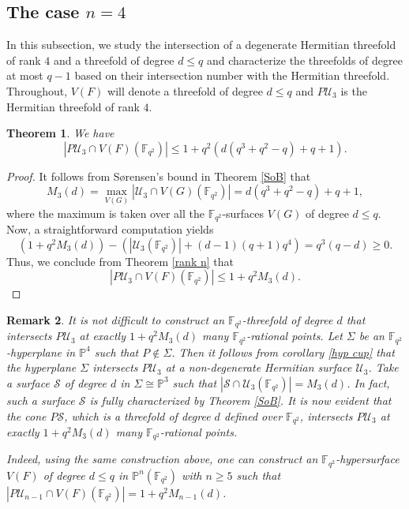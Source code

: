 \documentclass[10pt,a4paper,oneside]{amsproc}
\newtheorem{theorem}{Theorem}[section]
\newtheorem{remark}[theorem]{Remark}
\newcommand{\s}{\mathcal{S}}
\newcommand{\Fqt}{\mathbb{F}_{q^2}}
\newcommand{\U}{\mathcal{U}}
\def\PP{{\mathbb P}}
\begin{document}


\subsection{The case $n=4$}\label{n=4} In this subsection, we study the intersection of a degenerate Hermitian threefold of rank $4$ and a threefold of degree $d\leq q$ and characterize the threefolds of degree at most $q-1$ based on their intersection number with the Hermitian threefold. Throughout, $V(F)$ will denote a threefold of degree $d\leq q$ and $P\U_3$ is the Hermitian threefold of rank $4$.
\begin{theorem}\label{degenerate and threefold} 
  We have $$|P\U_3\cap V(F)(\Fqt)|\leq 1+q^2\left(d(q^3+q^2-q)+q+1\right).$$   
\end{theorem}
\begin{proof}
  It follows from S{\o}rensen's bound in Theorem \ref{SoB} that $$M_3(d)=\max_{V(G)}|\U_3\cap V(G)(\Fqt)|=d(q^3+q^2-q)+q+1,$$ where the maximum is taken over all the $\Fqt$-surfaces $V(G)$ of degree $d\leq q$. Now, a straightforward computation yields 
  \begin{equation}\label{inq: threefold}
      \left(1+q^2M_3(d)\right)-\left(|\U_3(\Fqt)|+(d-1)(q+1)q^4 \right)= q^3(q-d)\geq 0.
  \end{equation}
  Thus, we conclude from Theorem \ref{rank n} that $$|P\U_3\cap V(F)(\Fqt)|\leq 1+q^2M_3(d).$$
\end{proof}
\begin{remark}\label{when attained}
   \normalfont It is not difficult to construct an $\Fqt$-threefold of degree $d$ that intersects $P\U_3$ at exactly $1+q^2M_3(d)$ many $\Fqt$-rational points. Let $\Sigma$ be an $\Fqt$-hyperplane in $\PP^4$ such that $P\notin \Sigma$. Then it follows from corollary \ref{hyp cup} that the hyperplane $\Sigma$ intersects $P\U_3$ at a non-degenerate Hermitian surface $\U_3$. Take a surface $\s$ of degree $d$ in $\Sigma\cong \PP^3$ such that $|\s\cap \U_3(\Fqt)|=M_3(d)$. In fact, such a surface $\s$ is fully characterized by Theorem \ref{SoB}. It is now evident that the cone $P\s$, which is a threefold of degree $d$ defined over $\Fqt$, intersects $P\U_3$ at exactly $1+q^2M_3(d)$ many $\Fqt$-rational points. 
   
   Indeed, using the same construction above, one can construct an $\Fqt$-hypersurface $V(F)$ of degree $d\leq q$ in $\PP^n(\Fqt)$ with $n\geq 5$ such that $|P\U_{n-1}\cap V(F)(\Fqt)|=1+q^2M_{n-1}(d)$.
\end{remark}
\end{document}
